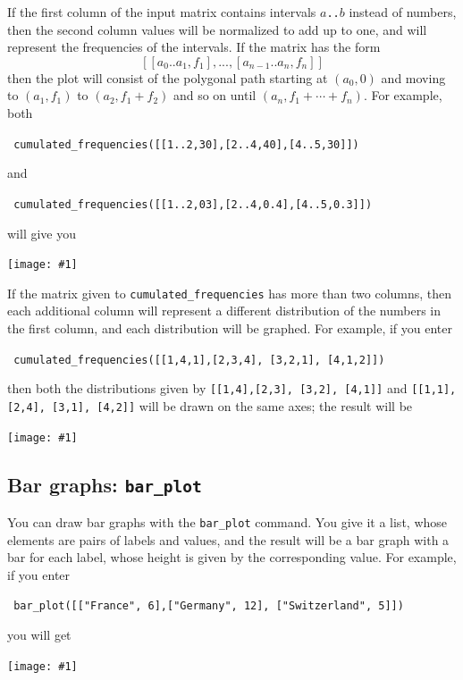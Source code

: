 \documentclass[a4paper,11pt]{book}
\newcommand{\includeimage}[1]
{\texttt{[image: \#1]}}
\begin{document}
If the first column of the input matrix contains intervals
\texttt{$a$..$b$} instead of numbers, then the second column values will
be normalized to add up to one, and will represent the frequencies of
the intervals.  If the matrix has the form 
\[ [[a_0..a_1,f_1],...,[a_{n-1}..a_n,f_n]] \]
then the plot will consist of the polygonal path starting at $(a_0,0)$
and moving to $(a_1,f_1)$ to $(a_2,f_1+f_2)$ and so on until
$(a_n,f_1+\cdots + f_n)$.  For example, both
\begin{center}
  \tt
  cumulated\_frequencies([[1..2,30],[2..4,40],[4..5,30]])
\end{center}
and
\begin{center}
  \tt
  cumulated\_frequencies([[1..2,03],[2..4,0.4],[4..5,0.3]])
\end{center}
will give you
\begin{center}
  \includeimage{xcas-cumfreqint.png}
\end{center}

If the matrix given to \texttt{cumulated\_frequencies} has more than
two columns, then each additional column will represent a different
distribution of the numbers in the first column, and each distribution
will be graphed.  For example, if you enter
\begin{center}
  \tt
    cumulated\_frequencies([[1,4,1],[2,3,4], [3,2,1], [4,1,2]])
\end{center}
then both the distributions given by 
\texttt{[[1,4],[2,3], [3,2], [4,1]]}
and
\texttt{[[1,1],[2,4], [3,1], [4,2]]}
will be drawn on the same axes; the result will be
\begin{center}
  \includeimage{xcas-cumfreq2.png}
\end{center}

\subsection{Bar graphs: \texttt{bar\_plot}}

You can draw bar graphs with the \texttt{bar\_plot} command.  You give
it a list, whose elements are pairs of labels and values, and the
result will be a bar graph with a bar for each label, whose height is
given by the corresponding value.  For example, if you enter
\begin{center}
  \tt
  bar\_plot([["France", 6],["Germany", 12], ["Switzerland", 5]])
\end{center}
you will get
\begin{center}
  \includeimage{xcas-barplot1.png}
\end{center}
\end{document}
